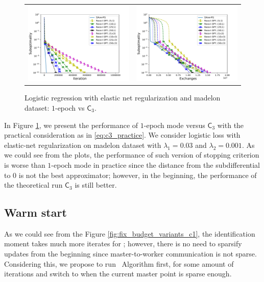 \begin{figure}[h!]
\begin{tabular}{cc}
\includegraphics[width = 0.49\linewidth]{spy/figs/madelon_10w_003_0001_fun_vs_ite_log_c3.pdf}&
\includegraphics[width = 0.49\linewidth]{spy/figs/madelon_10w_003_0001_fun_vs_ex_log_c3.pdf}\\%
\end{tabular}
\caption{Logistic regression with elastic net regularization and madelon dataset: $1$-epoch vs $\mathsf{C}_3$.}
\label{fig:c3_log}
\end{figure}
In Figure \ref{fig:c3_log}, we present the performance of $1$-epoch mode versus $\mathsf{C}_3$ with the practical consideration as in \eqref{eq:c3_practice}. We consider logistic loss with elastic-net regularization on madelon dataset with $\lambda_1 = 0.03$ and $\lambda_2 = 0.001$. As we could see from the plots, the performance of such version of stopping criterion is worse than $1$-epoch mode in practice since the distance from the subdifferential to $0$ is not the best approximator; however, in the beginning, the performance of the theoretical run $\mathsf{C}_3$ is still better. 

\subsection{Warm start}
As we could see from the Figure \ref{fig:fix_budget_variants_c1}, the identification moment takes much more iterates for \recoalgo; however, there is no need to sparsify updates from the beginning since master-to-worker communication is not sparse. Considering this, we propose to run \dave~Algorithm first, for some amount of iterations and switch to \recoalgo when the current master point is sparse enough.

